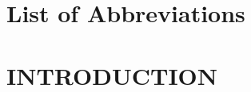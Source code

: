 \documentclass[12pt,oneside]{book}
\begin{document}
	\frontmatter
	
		
	\tableofcontents
	
	\listofalgorithms
	
	\chapter*{List of Abbreviations}
	

	\mainmatter
	
	\chapter{INTRODUCTION}
\end{document}
